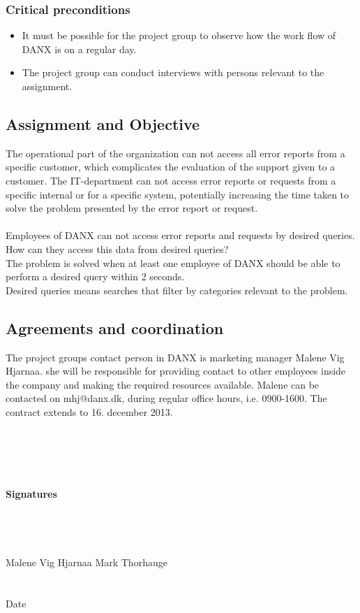 \documentclass[pdftext, 12pt, a4paper]{report}
\begin{document}
\subsubsection*{Critical preconditions}
\begin{itemize}
	\item It must be possible for the project group to observe how the work flow of DANX is on a regular day.
	\item The project group can conduct interviews with persons relevant to the assignment.
	\end{itemize}
\newpage
\subsection*{Assignment and Objective}
The operational part of the organization can not access all error reports from a specific customer, which complicates the evaluation of the support given to a customer. The IT-department can not access error reports or requests from a specific internal or for a specific system, potentially increasing the time taken to solve the problem presented by the error report or request. \\ \\
Employees of DANX can not access error reports and requests by desired queries. How can they access this data from desired queries? \\

The problem is solved when at least one employee of DANX should be able to perform a desired query within 2 seconds. \\

Desired queries means searches that filter by categories relevant to the problem.

\subsection*{Agreements and coordination}
The project groups contact person in DANX is marketing manager Malene Vig Hjarnaa. she will be responsible for providing contact to other employees inside the company and making the required resources available. Malene can be contacted on mhj@danx.dk, during regular office hours, i.e. 0900-1600. The contract extends to 16. december 2013.
\\ \\ \\ \\ \\ \\
\textbf{Signatures}
\\ \\ \\ \\
\underline{\hspace{9em}} \hspace*{12.8em} \underline{\hspace{9em}}
\\
Malene Vig Hjarnaa \hspace*{13em} Mark Thorhauge
\\ \\ \\
Date \underline{\hspace{9em}}
\end{document}
